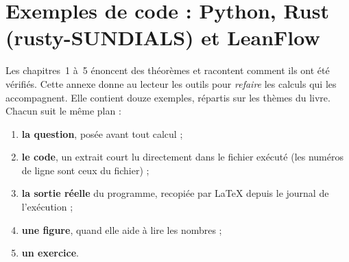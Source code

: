 \chapter{Exemples de code : Python, Rust (rusty-SUNDIALS) et LeanFlow}\label{appF:chap}

\newcommand{\appFsortie}[1]{\par\noindent\textbf{Sortie réelle} (\texttt{\detokenize{#1}}) :%
  }

Les chapitres~1 à~5 énoncent des théorèmes et racontent comment ils ont été vérifiés. Cette annexe donne au
lecteur les outils pour \emph{refaire} les calculs qui les accompagnent. Elle contient douze exemples, répartis sur les
thèmes du livre. Chacun suit le même plan :
\begin{enumerate}
\item \textbf{la question}, posée avant tout calcul ;
\item \textbf{le code}, un extrait court lu directement dans le fichier exécuté (les numéros de ligne sont ceux du
fichier) ;
\item \textbf{la sortie réelle} du programme, recopiée par \LaTeX{} depuis le journal de l'exécution ;
\item \textbf{une figure}, quand elle aide à lire les nombres ;
\item \textbf{un exercice}.
\end{enumerate}

